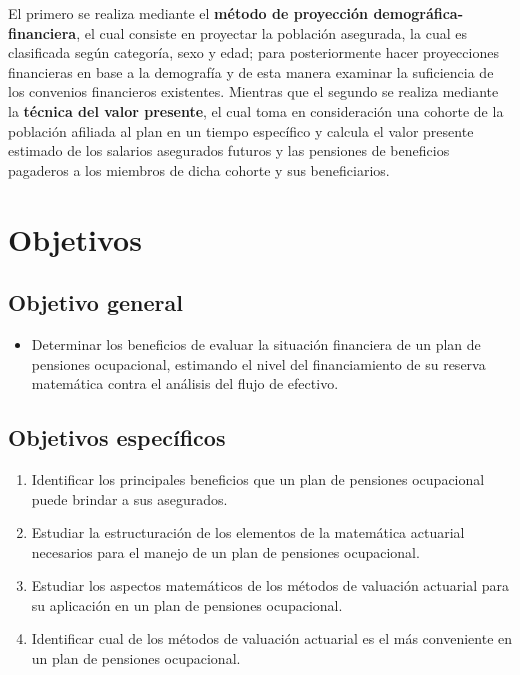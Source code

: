 \documentclass[12pt,letterpaper,titlepage]{article}
\begin{document}
El primero se realiza mediante el \textbf{método de proyección demográfica-financiera}, el cual consiste en proyectar la población asegurada, la cual es clasificada según categoría, sexo y edad; para posteriormente hacer proyecciones financieras en base a la demografía y de esta manera examinar la suficiencia de los convenios financieros existentes. Mientras que el segundo se realiza mediante la \textbf{técnica del valor presente}, el cual toma en consideración una cohorte de la población afiliada al plan en un tiempo específico y calcula el valor presente estimado de los salarios asegurados futuros y las pensiones de beneficios pagaderos a los miembros de dicha cohorte y sus beneficiarios.

\newpage

\section{Objetivos}


\subsection{Objetivo general}

\begin{itemize}
	\item Determinar los beneficios de evaluar la situación financiera de un plan de pensiones ocupacional, estimando el nivel del financiamiento de su reserva matemática contra el análisis del flujo de efectivo.
\end{itemize}


\subsection{Objetivos específicos}

\begin{enumerate}
	\item Identificar los principales beneficios que un plan de pensiones ocupacional puede brindar a sus asegurados.
	\item Estudiar la estructuración de los elementos de la matemática actuarial necesarios para el manejo de un plan de pensiones ocupacional.
	\item Estudiar los aspectos matemáticos de los métodos de valuación actuarial para su aplicación en un plan de pensiones ocupacional.
	\item Identificar cual de los métodos de valuación actuarial es el más conveniente en un plan de pensiones ocupacional. 
\end{enumerate}
\end{document}
